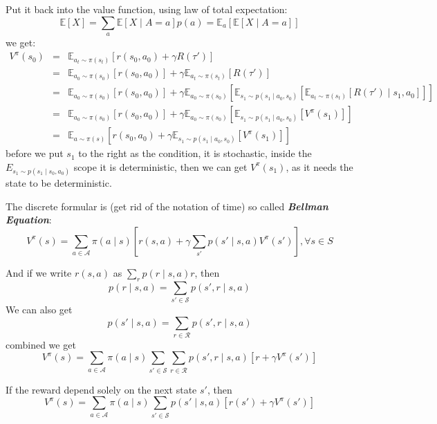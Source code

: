\documentclass[10pt]{elegantbook}
\newcommand{\mydefination}[1]{\textbf{\textit{\textcolor{structurecolor}{#1}}}}
\begin{document}
Put it back into the value function, using law of total expectation:
\[ \mathbb E[X] = \sum_a \mathbb E[X \mid A=a]p(a) = \mathbb E_a \left [\mathbb E[X \mid A=a] \right ] \]
we get:
\begin{equation}
    \begin{array}{lll}
    V^{\pi}(s_0) &=& \mathbb E_{a_t \sim \pi(s_t)}[r(s_0, a_0) + \gamma R(\tau')] \\
                 &=& \mathbb E_{a_0 \sim \pi(s_0)}[r(s_0, a_0)] + \gamma \mathbb E_{a_t \sim \pi(s_t)}[R(\tau')] \\
                 &=& \mathbb E_{a_0 \sim \pi(s_0)}[r(s_0, a_0)] + \gamma \mathbb E_{a_0 \sim \pi(s_0)}\left[\mathbb E_{s_1 \sim p(s_1 \mid a_0, s_0)}[\mathbb E_{a_t \sim \pi(s_t)}[R(\tau') \mid s_1, a_0]]\right] \\ 
                 &=& \mathbb E_{a_0 \sim \pi(s_0)}[r(s_0, a_0)] + \gamma \mathbb E_{a_0 \sim \pi(s_0)}\left[\mathbb E_{s_1 \sim p(s_1 \mid a_0, s_0)}[V^{\pi}(s_1)]\right] \\
                 &=& \mathbb E_{a \sim \pi(s)}\left[ r(s_0, a_0) + \gamma \mathbb E_{s_1 \sim p(s_1 \mid a_0, s_0)} [V^{\pi}(s_1)] \right]
    \end{array}
\end{equation}
before we put $s_1$ to the right as the condition, it is stochastic, inside the $E_{s_1 \sim p(s_1 \mid s_0, a_0)}$ scope it is deterministic, 
then we can get $V^{\pi}(s_1)$, as it needs the state to be deterministic.

The discrete formular is (get rid of the notation of time) so called \mydefination{Bellman Equation}:
\begin{equation} \label{eq:bellman_equation}
    V^{\pi}(s) = \sum_{a \in \mathcal A}\pi(a\mid s)\left[r(s,a) + \gamma \sum_{s'}p(s' \mid s, a)V^{\pi}(s')\right], \forall s \in S
\end{equation}

And if we write $r(s, a)$ as $\sum_r p(r \mid s, a) r$, then 
\[ p(r \mid s, a) = \sum_{s' \in \mathcal S}p(s', r \mid s, a) \]
We can also get
\[ p(s' \mid s, a) = \sum_{r \in \mathcal R} p(s', r \mid s, a) \]
combined we get
\begin{equation}
    V^{\pi}(s) = \sum_{a \in \mathcal A}\pi(a\mid s)\sum_{s' \in \mathcal S}\sum_{r \in \mathcal R}p(s', r \mid s, a)\left[r + \gamma V^{\pi}(s')\right]
\end{equation}

If the reward depend solely on the next state $s'$, then
\begin{equation}
    V^{\pi}(s) = \sum_{a \in \mathcal A}\pi(a\mid s)\sum_{s' \in \mathcal S}p(s' \mid s, a)\left[r(s') + \gamma V^{\pi}(s')\right]
\end{equation}
\end{document}
